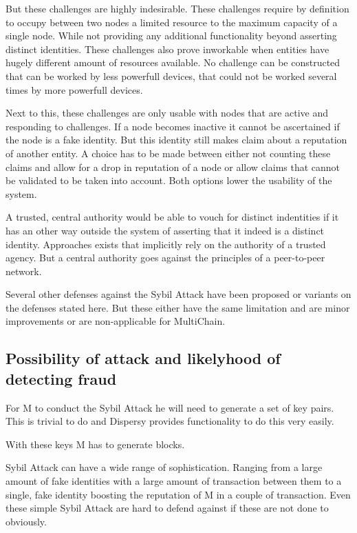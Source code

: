 But these challenges are highly indesirable.
These challenges require by definition to occupy between two nodes a limited resource to the maximum capacity of a single node.
While not providing any additional functionality beyond asserting distinct identities.
These challenges also prove inworkable when entities have hugely different amount of resources available.
No challenge can be constructed that can be worked by less powerfull devices,
that could not be worked several times by more powerfull devices.

Next to this, these challenges are only usable with nodes that are active and responding to challenges.
If a node becomes inactive it cannot be ascertained if the node is a fake identity.
But this identity still makes claim about a reputation of another entity.
A choice has to be made between either not counting these claims and allow for a drop in reputation of a node or
allow claims that cannot be validated to be taken into account.
Both options lower the usability of the system.

A trusted, central authority would be able to vouch for distinct indentities
if it has an other way outside the system of asserting that it indeed is a distinct identity.
Approaches exists that implicitly rely on the authority of a trusted agency.
But a central authority goes against the principles of a peer-to-peer network.

Several other defenses against the Sybil Attack have been proposed\cite{newsome-sybil}\cite{dinger-sybil}
or variants on the defenses stated here\cite{levine-sybilsurvey}.
But these either have the same limitation and are minor improvements or are non-applicable for MultiChain.

\subsection{Possibility of attack and likelyhood of detecting fraud}
For M to conduct the Sybil Attack he will need to generate a set of key pairs.
This is trivial to do and Dispersy provides functionality to do this very easily.


With these keys M has to generate blocks.


Sybil Attack can have a wide range of sophistication.
Ranging from a large amount of fake identities with a large amount of transaction between them
to a single, fake identity boosting the reputation of M in a couple of transaction.
Even these simple Sybil Attack are hard to defend against if these are not done to obviously.



